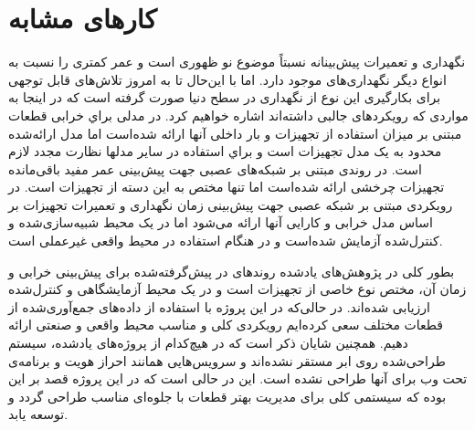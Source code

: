\section{کارهای مشابه}
نگهداری و تعمیرات پیش‌بینانه نسبتاً موضوع نو ظهوری است و عمر کمتری را نسبت به انواع دیگر نگهداری‌های موجود دارد. اما با این‌حال تا به امروز تلاش‌های قابل توجهی برای بکارگیری این نوع از نگهداری در سطح دنیا صورت گرفته است که در اینجا به مواردی که رویکردهای جالبی داشته‌اند اشاره خواهیم کرد. در \cite{tinga2010application} مدلی براي خرابی قطعات مبتنی بر ميزان استفاده از تجهيزات و بار داخلی آنها ارائه شده‌است اما مدل ارائه‌شده محدود به يک مدل تجهيزات است و براي استفاده در ساير مدلها نظارت مجدد لازم است. در \cite{wu2007neural} روندی مبتنی بر شبكه‌های عصبی جهت پيش‌بينی عمر مفيد باقی‌مانده تجهيزات چرخشی ارائه شده‌است اما تنها مختص به اين دسته از تجهيزات است. در \cite{kaiser2009predictive} رويكردی مبتنی بر شبكه عصبی جهت پيش‌بينی زمان نگهداری و تعميرات تجهيزات بر اساس مدل خرابی و كارايی آنها ارائه می‌شود اما در یک محيط شبيه‌سازی‌شده و كنترل‌شده آزمايش شده‌است و در هنگام استفاده در محيط واقعی غيرعملی است.

 بطور كلی در پژوهش‌های يادشده روندهای در پیش‌گرفته‌شده برای پیش‌بینی خرابی و زمان آن، مختص نوع خاصی از تجهيزات است و در يک محيط آزمايشگاهی و كنترل‌شده ارزيابی شده‌اند. در حالی‌كه در اين پروژه با استفاده از داده‌های جمع‌آوری‌شده از قطعات مختلف سعی كرده‌ايم رويكردی كلی و مناسب محيط واقعی و صنعتی ارائه دهيم. همچنین شایان ذکر است که در هیچ‌کدام از پروژه‌های یاد‌شده، سیستم طراحی‌شده روی ابر مستقر نشده‌اند و سرویس‌هایی همانند احراز هویت و برنامه‌ی تحت وب برای آنها طراحی نشده است. این در حالی است که در این پروژه قصد بر این بوده که سیستمی کلی برای مدیریت بهتر قطعات با جلوه‌ای مناسب طراحی گردد و توسعه یابد.
